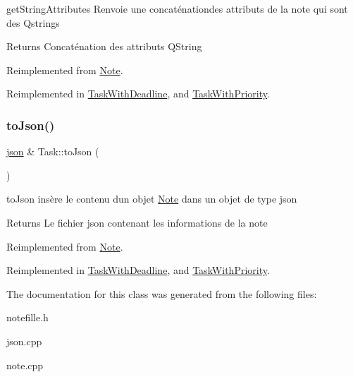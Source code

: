 get\+String\+Attributes Renvoie une concaténationdes attributs de la note qui sont des Qstrings 

\begin{DoxyReturn}{Returns}
Concaténation des attributs Q\+String 
\end{DoxyReturn}


Reimplemented from \hyperlink{classNote_a0ffff907bdb41b8c6a4abe62dfa3a2c1}{Note}.



Reimplemented in \hyperlink{classTaskWithDeadline_a2fda40b455e7eebb550b41edf451dfdb}{Task\+With\+Deadline}, and \hyperlink{classTaskWithPriority_a8463ac90713f33e4e9ca04de18eebb8b}{Task\+With\+Priority}.

\mbox{\label{classTask_af20f0085e2426cbf64955a03d8920400}} 
\subsubsection{\texorpdfstring{to\+Json()}{toJson()}}
{\footnotesize\ttfamily \hyperlink{classnlohmann_1_1basic__json}{json} \& Task\+::to\+Json (\begin{DoxyParamCaption}{ }\end{DoxyParamCaption})\hspace{0.3cm}{\ttfamily [virtual]}}



to\+Json insère le contenu d\textquotesingle{}un objet \hyperlink{classNote}{Note} dans un objet de type json 

\begin{DoxyReturn}{Returns}
Le fichier json contenant les informations de la note 
\end{DoxyReturn}


Reimplemented from \hyperlink{classNote_ac5bd9736feb45b144795d7ef1fc6a1ae}{Note}.



Reimplemented in \hyperlink{classTaskWithDeadline_a7ded765b2eb469cb31538bd52f75ae6e}{Task\+With\+Deadline}, and \hyperlink{classTaskWithPriority_adeda4ce31e96224993db991c60fccbc7}{Task\+With\+Priority}.



The documentation for this class was generated from the following files\+:\begin{DoxyCompactItemize}
\item 
notefille.\+h\item 
json.\+cpp\item 
note.\+cpp\end{DoxyCompactItemize}
